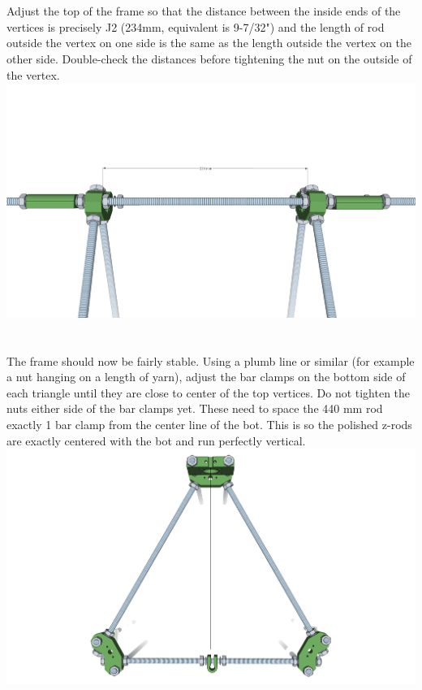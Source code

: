 \documentclass[twoside,a4paper,titlepage]{memoir}
\begin{document}
	\section{}
	Adjust the top of the frame so that the distance between the inside ends of the vertices is precisely J2
	(234mm, equivalent is 9-7/32") and the length of rod outside the vertex on one side is the same as the
	length outside the vertex on the other side. Double-check the distances before tightening the nut on the
	outside of the vertex.\\
	\includegraphics[width=1\linewidth]{graphics/ch5_3.png}
	
	\section{}
	The frame should now be fairly stable. Using a plumb line or similar (for example a nut hanging on a
	length of yarn), adjust the bar clamps on the bottom side of each triangle until they are close to center
	of the top vertices. Do not tighten the nuts either side of the bar clamps yet. These need to space the
	440 mm rod exactly 1 bar clamp from the center line of the bot. This is so the polished z-rods are
	exactly centered with the bot and run perfectly vertical.\\
	\includegraphics[width=1\linewidth]{graphics/ch5_4.png}
	
\end{document}
